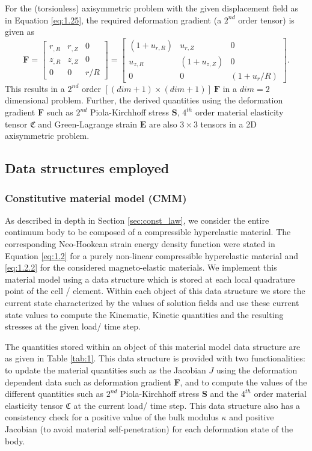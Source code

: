 \documentclass[11pt,a4paper,final]{article}
\begin{document}
For the (torsionless) axisymmetric problem with the given displacement field as in Equation \eqref{eq:1.25}, the required deformation gradient (a $2^{nd}$ order tensor) is given as \cite{Zienkiewicz2013}
\begin{equation}
\mathbf{F} = \begin{bmatrix}
r_{, R} & r_{, Z} & 0 \\
z_{, R} & z_{, Z} & 0 \\
0 & 0 & r/R
\end{bmatrix} = \begin{bmatrix}
(1 + u_{r, R}) & u_{r, Z} & 0 \\
u_{z, R} & (1 + u_{z, Z}) & 0 \\
0 & 0 & (1 + u_r / R)
\end{bmatrix}.
\label{eq:1.26}
\end{equation}
This results in a $2^{nd}$ order $[(dim + 1) \times (dim + 1)] \ \mathbf{F}$ in a $dim = 2$ dimensional problem.  Further, the derived quantities using the deformation gradient $\mathbf{F}$ such as $2^{nd}$ Piola-Kirchhoff stress $\mathbf{S}$, $4^{th}$ order material elasticity tensor $\mathfrak{C}$ and Green-Lagrange strain $\mathbf{E}$ are also $3 \times 3$ tensors in a 2D axisymmetric problem.

\subsection{Data structures employed}
\subsubsection{Constitutive material model (CMM)}
As described in depth in Section \eqref{sec:const_law}, we consider the entire continuum body to be composed of a compressible hyperelastic material. The corresponding Neo-Hookean strain energy density function were stated in Equation \eqref{eq:1.2} for a purely non-linear compressible hyperelastic material and \eqref{eq:1.2.2} for the considered magneto-elastic materials. We implement this material model using a data structure which is stored at each local quadrature point of the cell / element. Within each object of this data structure we store the current state characterized by the values of solution fields and use these current state values to compute the Kinematic, Kinetic quantities and the resulting stresses at the given load/ time step.\par 
The quantities stored within an object of this material model data structure are as given in Table \eqref{tab:1}. This data structure is provided with two functionalities: to update the material quantities such as the Jacobian $J$ using the deformation dependent data such as deformation gradient $\mathbf{F}$, and to compute the values of the different quantities such as $2^{nd}$ Piola-Kirchhoff stress $\mathbf{S}$ and the $4^{th}$ order material elasticity tensor $\mathfrak{C}$ at the current load/ time step. This data structure also has a consistency check for a positive value of the bulk modulus $\kappa$ and positive Jacobian (to avoid material self-penetration) for each deformation state of the body. \par 
\end{document}
